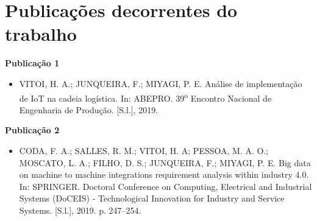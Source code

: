\chapter{Publicações decorrentes do trabalho}
\label{cha:publicacoes}

	\textbf{Publicação 1} \cite{vitoi2019logistica}
	\begin{itemize}
		\item VITOI, H. A.; JUNQUEIRA, F.; MIYAGI, P. E. Análise de implementação de IoT na cadeia logística. In: ABEPRO. 39\textsuperscript{o} Encontro Nacional de Engenharia de Produção. [S.l.], 2019.
	\end{itemize}
	
	\bigskip

	\textbf{Publicação 2} \cite{coda2019bigdata}
	\begin{itemize}
		\item CODA, F. A.; SALLES, R. M.; VITOI, H. A; PESSOA, M. A. O.; MOSCATO, L. A.; FILHO, D. S.; JUNQUEIRA, F.; MIYAGI, P. E. Big data on machine to machine integrations requirement analysis within industry 4.0. In: SPRINGER. Doctoral Conference on Computing, Electrical and Industrial Systems (DoCEIS) - Technological Innovation for Industry and Service Systems. [S.l.], 2019. p. 247–254. 
	\end{itemize}
